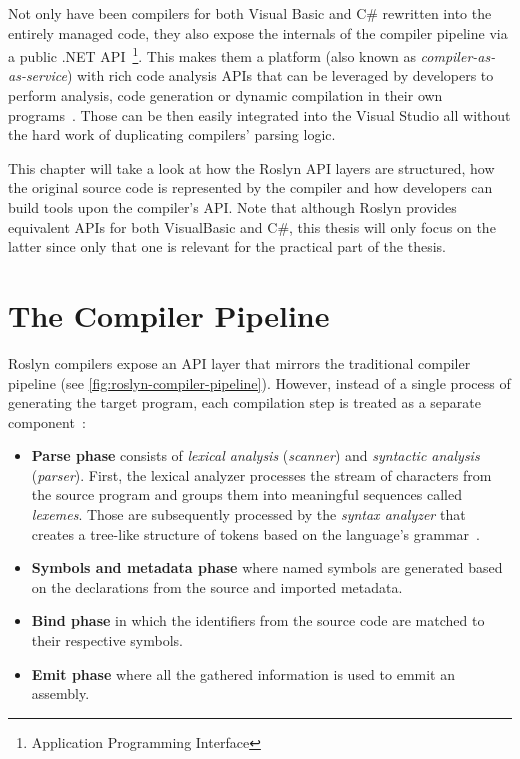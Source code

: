 \documentclass[
  digital, %
  table,   %
  lof,     %
  lot,     %
  oneside,
]{fithesis3}
\begin{document}

Not only have been compilers for both Visual Basic and C\# rewritten into the entirely managed code, they also expose the internals of the compiler pipeline via a public .NET API~\footnote{Application Programming Interface}. This makes them a platform (also known as \textit{compiler-as-as-service}) with rich code analysis APIs that can be leveraged by developers to perform analysis, code generation or dynamic compilation in their own programs~\cite{roslyn-succinctly}. Those can be then easily integrated into the Visual Studio all without the hard work of duplicating compilers' parsing logic.

This chapter will take a look at how the Roslyn API layers are structured, how the original source code is represented by the compiler and how developers can build tools upon the compiler's API. Note that although Roslyn provides equivalent APIs for both VisualBasic and C\#, this thesis will only focus on the latter since only that one is relevant for the practical part of the thesis.  
  
\section{The Compiler Pipeline}
Roslyn compilers expose an API layer that mirrors the traditional compiler pipeline (see \ref{fig:roslyn-compiler-pipeline}). However, instead of a single process of generating the target program, each compilation step is treated as a separate component~\cite{roslyn-overview}:

\begin{itemize}
  \item \textbf{Parse phase} consists of \textit{lexical analysis} (\textit{scanner}) and \textit{syntactic analysis} (\textit{parser}). First, the lexical analyzer processes the stream of characters from the source program and groups them into meaningful sequences called \textit{lexemes}. Those are subsequently processed by the \textit{syntax analyzer} that creates a tree-like structure of tokens based on the language's grammar~\cite{dragon-book}.

  \item \textbf{Symbols and metadata phase} where named symbols are generated based on the declarations from the source and imported metadata.

  \item \textbf{Bind phase} in which the identifiers from the source code are matched to their respective symbols.

  \item \textbf{Emit phase} where all the gathered information is used to emmit an assembly.
\end{itemize}
\end{document}

